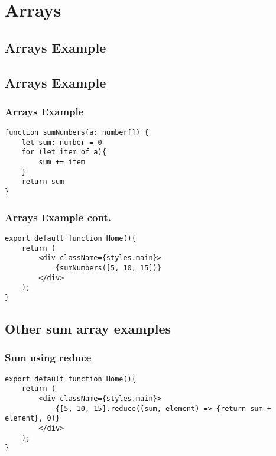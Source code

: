 \documentclass{beamer}
\begin{document}
\section{Arrays}

\subsection{Arrays Example}
\begin{frame}[fragile]
\subsection{Arrays Example}
\frametitle{Arrays Example}
\begin{lstlisting}
function sumNumbers(a: number[]) {
    let sum: number = 0
    for (let item of a){
        sum += item
    }
    return sum
}
\end{lstlisting}
\end{frame}

\begin{frame}[fragile]
\frametitle{Arrays Example cont.}
\begin{lstlisting}
export default function Home(){
    return (
        <div className={styles.main}>
            {sumNumbers([5, 10, 15])}
        </div>
    );
}
\end{lstlisting}
\end{frame}

\subsection{Other sum array examples}

\fontsize{6pt}{6pt}\selectfont
\begin{frame}[fragile]
\frametitle{Sum using reduce}
\begin{lstlisting}
export default function Home(){
    return (
        <div className={styles.main}>
            {[5, 10, 15].reduce((sum, element) => {return sum + element}, 0)}
        </div>
    );
}
\end{lstlisting}
\end{frame}
\end{document}
